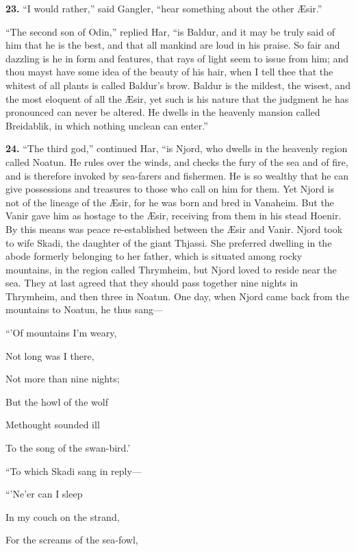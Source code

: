 
\textbf{23.} ``I would rather,'' said Gangler, ``hear something about the other
Æsir.''

``The second son of Odin,'' replied Har, ``is Baldur, and it may be truly
said of him that he is the best, and that all mankind are loud in his
praise. So fair and dazzling is he in form and features, that rays of
light seem to issue from him; and thou mayst have some idea of the
beauty of his hair, when I tell thee that the whitest of all plants is
called Baldur's brow. Baldur is the mildest, the wisest, and the most
eloquent of all the Æsir, yet such is his nature that the judgment he
has pronounced can never be altered. He dwells in the heavenly mansion
called Breidablik, in which nothing unclean can enter.''


\textbf{24.} ``The third god,'' continued Har, ``is Njord, who dwells in the
heavenly region called Noatun. He rules over the winds, and checks the
fury of the sea and of fire, and is therefore invoked by sea-farers
and fishermen. He is so wealthy that he can give possessions and
treasures to those who call on him for them. Yet Njord is not of the
lineage of the Æsir, for he was born and bred in Vanaheim. But the
Vanir gave him as hostage to the Æsir, receiving from them in his
stead Hoenir. By this means was peace re-established between the Æsir
and Vanir. Njord took to wife Skadi, the daughter of the giant
Thjassi. She preferred dwelling in the abode formerly belonging to her
father, which is situated among rocky mountains, in the region called
Thrymheim, but Njord loved to reside near the sea. They at last agreed
that they should pass together nine nights in Thrymheim, and then
three in Noatun. One day, when Njord came back from the mountains to
Noatun, he thus sang—

``'Of mountains I'm weary,

Not long was I there,

Not more than nine nights;

But the howl of the wolf

Methought sounded ill

To the song of the swan-bird.'

``To which Skadi sang in reply—

``'Ne'er can I sleep

In my couch on the strand,

For the screams of the sea-fowl,

